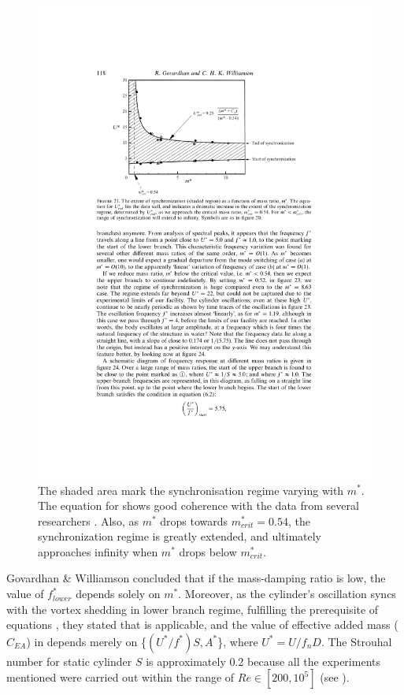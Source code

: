\begin{figure}[tbp]
	\centering
	\captionsetup{justification=centering}
	\includegraphics[width=0.8\linewidth]{Figs/syncregime}
	\caption{The shaded area mark the synchronisation regime varying with $m^*$. The equation for \usend{} shows good coherence with the data from several researchers \cite{GOVARDHAN2000,Hover1998, KHALAK1999,Torum1985}. Also, as $m^*$ drops towards $m^*_{crit} = 0.54$, the synchronization regime is greatly extended, and ultimately approaches infinity when $m^*$ drops below $m^*_{crit}$. \cite{GOVARDHAN2000}}
	\label{fig:syncregime}
\end{figure}
Govardhan \& Williamson \cite{GOVARDHAN2000} concluded that if the mass-damping ratio is low, the value of $f^*_{lower}$ depends solely on $m^*$. Moreover, as the cylinder's oscillation syncs with the vortex shedding in lower branch regime, fulfilling the prerequisite of equations , they stated that  is applicable, and the value of effective added mass ($C_{EA}$) in  depends merely on \{$(U^*/f^*)S, A^*$\}, where $U^*=U/{f_nD}$. The Strouhal number for static cylinder $ S $ is approximately 0.2 because all the experiments mentioned were carried out within the range of $Re \in [200,10^5]$ (see ).
